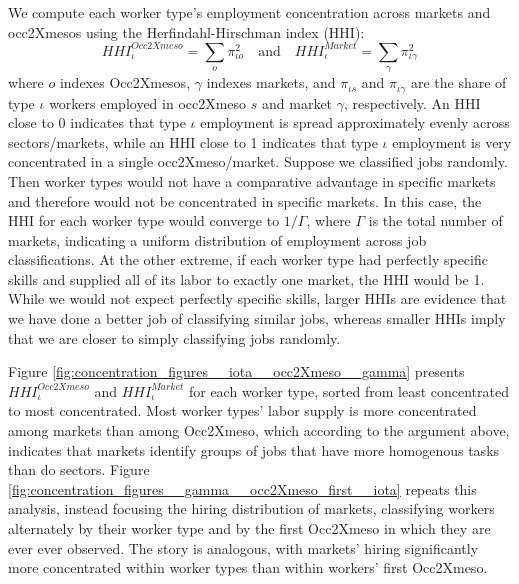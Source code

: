 \documentclass[12pt]{article}
\def\g{\gamma}
\def\i{\iota}
\theoremstyle{definition}
\theoremstyle{plain}
\begin{document}
We compute each worker type's employment concentration across markets and occ2Xmesos using the Herfindahl-Hirschman index (HHI): 
\[ HHI_{\i}^{Occ2Xmeso} = \sum_o \pi_{\i o}^2 \quad \text{and} \quad  HHI_{\i}^{Market} = \sum_\g \pi_{\i \g}^2 \]
where $o$ indexes Occ2Xmesos, $\g$ indexes markets, and $\pi_{\i s}$ and $\pi_{\i \g}$ are the share of type $\i$ workers employed in occ2Xmeso $s$ and market $\g$, respectively. An HHI close to 0 indicates that type $\i$ employment is spread approximately evenly across sectors/markets, while an HHI close to 1 indicates that type $\i$ employment is very concentrated in a single occ2Xmeso/market. Suppose we classified jobs randomly. Then worker types would not have a comparative advantage in specific markets and therefore would not be concentrated in specific markets. In this case, the HHI for each worker type would converge to $1/\Gamma$, where $\Gamma$ is the total number of markets, indicating a uniform distribution of employment across job classifications. At the other extreme, if each worker type had perfectly specific skills and supplied all of its labor to exactly one market, the HHI would be 1. While we would not expect perfectly specific skills,  larger HHIs are evidence that we have done a better job of classifying similar jobs, whereas smaller HHIs imply that we are closer to simply classifying jobs randomly. 


Figure \ref{fig:concentration_figures__iota__occ2Xmeso__gamma} presents $ HHI_{\i}^{Occ2Xmeso}$ and $ HHI_{\i}^{Market}$ for each worker type, sorted from least concentrated to most concentrated. Most worker types' labor supply is more concentrated among markets than among Occ2Xmeso, which according to the argument above, indicates that markets identify groups of jobs that have more homogenous tasks than do sectors. Figure \ref{fig:concentration_figures__gamma__occ2Xmeso_first__iota} repeats this analysis, instead focusing the hiring distribution of markets, classifying workers alternately by their worker type and by the first Occ2Xmeso in which they are ever ever observed. The story is analogous, with markets' hiring significantly more concentrated within worker types than within workers' first Occ2Xmeso. %
\end{document}
